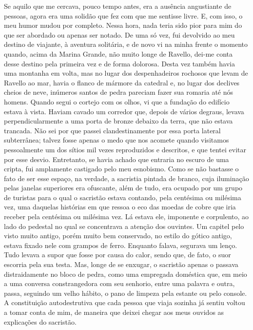 Se aquilo que me cercava, pouco tempo antes, era a ausência angustiante
de pessoas, agora era uma solidão que fez com que me sentisse livre. E,
com isso, o meu humor mudou por completo. Nessa hora, nada teria sido
pior para mim do que ser abordado ou apenas ser notado. De uma só vez,
fui devolvido ao meu destino de viajante, à aventura solitária, e de
novo vi na minha frente o momento quando, acima da Marina Grande, não
muito longe de Ravello, dei-me conta desse destino pela primeira vez e
de forma dolorosa. Desta vez também havia uma montanha em volta, mas no
lugar dos despenhadeiros rochosos que levam de Ravello ao mar, havia o
flanco de mármore da catedral e, no lugar dos declives cheios de neve,
inúmeros santos de pedra pareciam fazer sua romaria até nós homens.
Quando segui o cortejo com os olhos, vi que a fundação do edifício
estava à vista. Haviam cavado um corredor que, depois de vários degraus,
levava perpendicularmente a uma porta de bronze debaixo da terra, que
não estava trancada. Não sei por que passei clandestinamente por essa
porta lateral subterrânea; talvez fosse apenas o medo que nos acomete
quando visitamos pessoalmente um dos sítios mil vezes reproduzidos e
descritos, e que tentei evitar por esse desvio. Entretanto, se havia
achado que entraria no escuro de uma cripta, fui amplamente castigado
pelo meu esnobismo. Como se não bastasse o fato de ser esse espaço, na
verdade, a sacristia pintada de branco, cuja iluminação pelas janelas
superiores era ofuscante, além de tudo, era ocupado por um grupo de
turistas para o qual o sacristão estava contando, pela centésima ou
milésima vez, uma daquelas histórias em que ressoa o eco das moedas de
cobre que iria receber pela centésima ou milésima vez. Lá estava ele,
imponente e corpulento, ao lado do pedestal no qual se concentrava a
atenção dos ouvintes. Um capitel pelo visto muito antigo, porém muito
bem conservado, no estilo do gótico antigo, estava fixado nele com
grampos de ferro. Enquanto falava, segurava um lenço. Tudo levava a
supor que fosse por causa do calor, sendo que, de fato, o suor escorria
pela sua testa. Mas, longe de se enxugar, o sacristão apenas o passava
distraidamente no bloco de pedra, como uma empregada doméstica que, em
meio a uma conversa constrangedora com seu senhorio, entre uma palavra e
outra, passa, seguindo um velho hábito, o pano de limpeza pela estante
ou pelo console. A constituição autodestrutiva que cada pessoa que viaja
sozinha já sentiu voltou a tomar conta de mim, de maneira que deixei
chegar aos meus ouvidos as explicações do sacristão.

